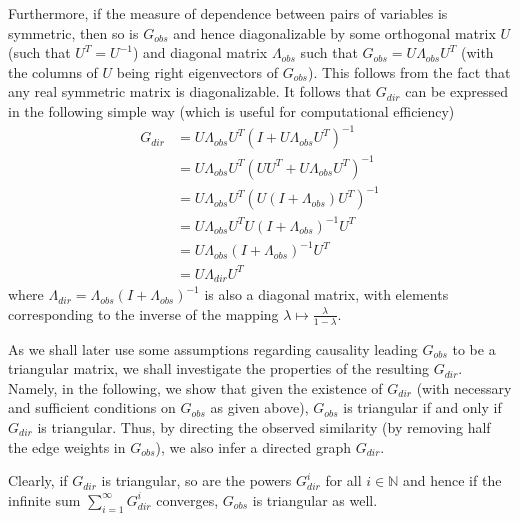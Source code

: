 \documentclass[../Thesis.tex]{subfiles}
\begin{document}
Furthermore, if the measure of dependence between pairs of variables is symmetric, then so is $G_{obs}$ and hence diagonalizable by some orthogonal matrix $U$ (such that $U^T = U^{-1}$) and diagonal matrix $\Lambda_{obs}$ such that $G_{obs} = U \Lambda_{obs} U^T$ (with the columns of $U$ being right eigenvectors of $G_{obs}$). This follows from the fact that any real symmetric matrix is diagonalizable. It follows that $G_{dir}$ can be expressed in the following simple way (which is useful for computational efficiency)
\begin{align*}
    G_{dir} &= U \Lambda_{obs} U^T \left(I + U \Lambda_{obs} U^T\right)^{-1}\\
    & = U \Lambda_{obs} U^T \left(U U^T + U \Lambda_{obs} U^T\right)^{-1}\\
    & = U \Lambda_{obs} U^T \left(U \left(I + \Lambda_{obs}\right) U^T\right)^{-1}\\
    & = U \Lambda_{obs} U^T U \left(I + \Lambda_{obs}\right)^{-1} U^T\\
    & = U \Lambda_{obs} \left(I + \Lambda_{obs}\right)^{-1} U^T\\
    & = U \Lambda_{dir} U^T
\end{align*}
where $\Lambda_{dir} = \Lambda_{obs} \left(I + \Lambda_{obs}\right)^{-1}$ is also a diagonal matrix, with elements corresponding to the inverse of the mapping $\lambda \mapsto \frac{\lambda}{1 - \lambda}$.

As we shall later use some assumptions regarding causality leading $G_{obs}$ to be a triangular matrix, we shall investigate the properties of the resulting $G_{dir}$. Namely, in the following, we show that given the existence of $G_{dir}$ (with necessary and sufficient conditions on $G_{obs}$ as given above), $G_{obs}$ is triangular if and only if $G_{dir}$ is triangular. Thus, by directing the observed similarity (by removing half the edge weights in $G_{obs}$), we also infer a directed graph $G_{dir}$.

Clearly, if $G_{dir}$ is triangular, so are the powers $G_{dir}^i$ for all $i\in\mathbb{N}$ and hence if the infinite sum $\sum_{i=1}^{\infty} G_{dir}^{i}$ converges, $G_{obs}$ is triangular as well.
\end{document}
